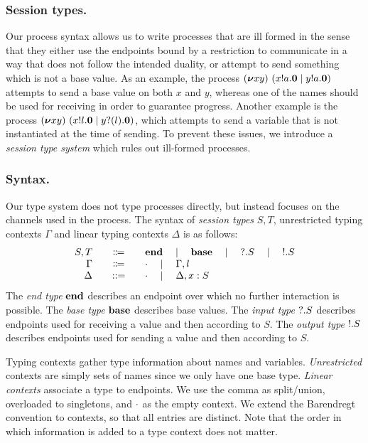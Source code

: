 \subsubsection{Session types.}
Our process syntax allows us to write processes that are ill formed in
the sense that they either use the endpoints bound by a restriction to
communicate in a way that does not follow the intended duality, or
attempt to send something which is not a base value.  As an example,
the process
\( (\bm{\nu} xy)~(x ! a . \bm{0} \mid y ! a . \bm{0}) \)
attempts to send a base value on both \( x \) and \( y\), whereas one
of the names should be used for receiving in order to guarantee
progress.  Another example is the process
\( (\bm{\nu} xy)~(x ! l . \bm{0} \mid y ? (l) . \bm{0}) \),
which attempts to send a variable that is not instantiated at the time
of sending.
%
To prevent these issues, we introduce a \emph{session type system} which
rules out ill-formed processes.

\subsubsection{Syntax.}
Our type system does not type processes directly, but instead focuses on the channels used in the process.
The syntax of \emph{session types} \( S, T \), unrestricted typing contexts \( \Gamma \) and linear typing contexts \( \Delta \) is as follows:
\[
  \begin{array}{r@{\qquad}c@{\qquad}l}
  S,T & \Coloneqq & \Tend \quad\mid\quad \Tbase \quad\mid\quad \Tin{S} \quad\mid\quad \Tout{S} \\
    \Gamma & \Coloneqq & \Cempty \quad\mid\quad \Gamma, l \\
                    \Delta &::= & \Cempty \quad\mid\quad \Cadd{\Delta}{\hastype{x}{S}}
  \end{array}
\]
The \emph{end type} \( \mathbf{end} \) describes an endpoint over which no further interaction is possible.
The \emph{base type} \( \mathbf{base} \) describes base values.
The \emph{input type} \( {?}.S \) describes endpoints used for receiving a value and then according to \( S \).
The \emph{output type} \( {!}.S \) describes endpoints used for sending a value and then according to \( S \).

Typing contexts gather type information about names and variables.
\emph{Unrestricted} contexts are simply sets of names since we only have one
base type. \emph{Linear contexts} associate a type to endpoints. We use
the comma as split/union, overloaded to singletons, and \( \cdot \) as the
empty context. We extend the Barendregt convention  to contexts, so that all
entries are distinct.  Note that the order in which information is added to a
type context does not matter.

